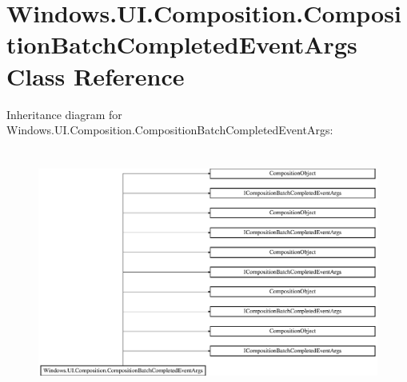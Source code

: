 \hypertarget{class_windows_1_1_u_i_1_1_composition_1_1_composition_batch_completed_event_args}{}\section{Windows.\+U\+I.\+Composition.\+Composition\+Batch\+Completed\+Event\+Args Class Reference}
\label{class_windows_1_1_u_i_1_1_composition_1_1_composition_batch_completed_event_args}
Inheritance diagram for Windows.\+U\+I.\+Composition.\+Composition\+Batch\+Completed\+Event\+Args\+:\begin{figure}[H]
\begin{center}
\leavevmode
\includegraphics[height=8.126648cm]{class_windows_1_1_u_i_1_1_composition_1_1_composition_batch_completed_event_args}
\end{center}
\end{figure}
